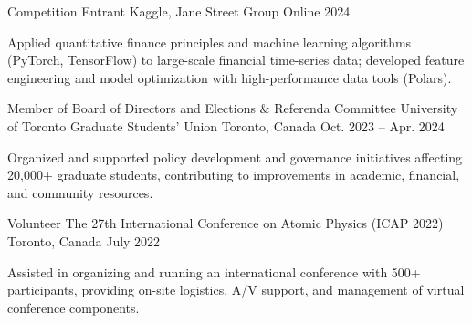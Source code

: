 

\begin{cventries}

  \cventry
    {Competition Entrant} %
    {Kaggle, Jane Street Group} %
    {Online} %
    {2024} %
    {
      \begin{cvitems} %
        \item {Applied quantitative finance principles and machine learning algorithms (PyTorch, TensorFlow) to large-scale financial time-series data; developed feature engineering and model optimization with high-performance data tools (Polars).}
      \end{cvitems}
    }

  \cventry
    {Member of Board of Directors and Elections \& Referenda Committee} %
    {University of Toronto Graduate Students' Union} %
    {Toronto, Canada} %
    {Oct. 2023 -- Apr. 2024} %
    {
      \begin{cvitems} %
        \item {Organized and supported policy development and governance initiatives affecting 20,000+ graduate students, contributing to improvements in academic, financial, and community resources.}
      \end{cvitems}
    }

    \cventry
      {Volunteer} %
      {The 27th International Conference on Atomic Physics (ICAP 2022)} %
      {Toronto, Canada} %
      {July 2022} %
      {
        \begin{cvitems}
        \item {Assisted in organizing and running an international conference with 500+ participants, providing on-site logistics, A/V support, and management of virtual conference components.}
        \end{cvitems}
      }



\end{cventries}
